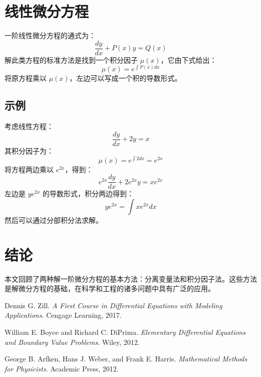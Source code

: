 \documentclass[12pt]{ctexart}
\begin{document}
\section{线性微分方程}

一阶线性微分方程的通式为：
\begin{equation}
\frac{dy}{dx} + P(x)y = Q(x)
\end{equation}
解此类方程的标准方法是找到一个积分因子 \( \mu(x) \)，它由下式给出：
\begin{equation}
\mu(x) = e^{\int P(x) dx}
\end{equation}
将原方程乘以 \( \mu(x) \)，左边可以写成一个积的导数形式。

\subsection{示例}

考虑线性方程：
\begin{equation}
\frac{dy}{dx} + 2y = x
\end{equation}
其积分因子为：
\begin{equation}
\mu(x) = e^{\int 2 dx} = e^{2x}
\end{equation}
将方程两边乘以 \( e^{2x} \)，得到：
\begin{equation}
e^{2x} \frac{dy}{dx} + 2e^{2x}y = xe^{2x}
\end{equation}
左边是 \( y e^{2x} \) 的导数形式，积分两边得到：
\begin{equation}
y e^{2x} = \int xe^{2x} dx
\end{equation}
然后可以通过分部积分法求解。

\section{结论}

本文回顾了两种解一阶微分方程的基本方法：分离变量法和积分因子法。这些方法是解微分方程的基础，在科学和工程的诸多问题中具有广泛的应用。

\begin{thebibliography}{9}

Dennis G. Zill. \textit{A First Course in Differential Equations with Modeling Applications}. Cengage Learning, 2017.

William E. Boyce and Richard C. DiPrima. \textit{Elementary Differential Equations and Boundary Value Problems}. Wiley, 2012.

George B. Arfken, Hans J. Weber, and Frank E. Harris. \textit{Mathematical Methods for Physicists}. Academic Press, 2012.

\end{thebibliography}
\end{document}
